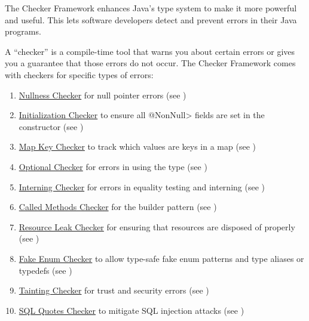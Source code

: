 
The Checker Framework enhances Java's type system to make it more powerful
and useful.
This lets software developers detect and
prevent errors in their Java programs.

A ``checker'' is a compile-time tool that warns you about certain errors or gives you a
guarantee that those errors do not occur.
The Checker Framework comes with checkers for specific types of errors:

\begin{enumerate}

\item
  \hyperref[nullness-checker]{Nullness Checker} for null pointer errors
  (see )
\item
  \hyperref[initialization-checker]{Initialization Checker} to ensure all
  \<@NonNull> fields are set in the constructor (see
  )
\item
  \hyperref[map-key-checker]{Map Key Checker} to track which values are
  keys in a map (see )
\item
  \hyperref[optional-checker]{Optional Checker} for errors in using the
   type (see
  )
\item
  \hyperref[interning-checker]{Interning Checker} for errors in equality
  testing and interning (see )
\item
  \hyperref[called-methods-checker]{Called Methods Checker} for
  the builder pattern (see )
\item
  \hyperref[resource-leak-checker]{Resource Leak Checker} for ensuring that resources are disposed of properly
  (see )
\item
  \hyperref[fenum-checker]{Fake Enum Checker} to allow type-safe fake enum
  patterns and type aliases or typedefs (see )
\item
  \hyperref[tainting-checker]{Tainting Checker} for trust and security errors
  (see )
\item
  \hyperref[sql-quotes-checker]{SQL Quotes Checker} to mitigate SQL injection
  attacks
  (see )

\end{enumerate}
